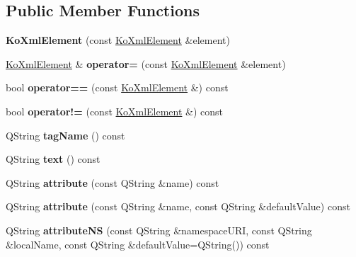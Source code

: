 \subsection*{Public Member Functions}
\begin{CompactItemize}
\item 
\hypertarget{classKoXmlElement_b5637448b6070d8ac7a84ab56890ca10}{
\textbf{KoXmlElement} (const \hyperlink{classKoXmlElement}{KoXmlElement} \&element)}
\label{classKoXmlElement_b5637448b6070d8ac7a84ab56890ca10}

\item 
\hypertarget{classKoXmlElement_eadd8e4eb16e9e3e3b9d2920fd183a34}{
\hyperlink{classKoXmlElement}{KoXmlElement} \& \textbf{operator=} (const \hyperlink{classKoXmlElement}{KoXmlElement} \&element)}
\label{classKoXmlElement_eadd8e4eb16e9e3e3b9d2920fd183a34}

\item 
\hypertarget{classKoXmlElement_83343b34a11ddcbe2bb896a37ea41b1a}{
bool \textbf{operator==} (const \hyperlink{classKoXmlElement}{KoXmlElement} \&) const }
\label{classKoXmlElement_83343b34a11ddcbe2bb896a37ea41b1a}

\item 
\hypertarget{classKoXmlElement_85276f0c883f6af251d52548dcb2e01f}{
bool \textbf{operator!=} (const \hyperlink{classKoXmlElement}{KoXmlElement} \&) const }
\label{classKoXmlElement_85276f0c883f6af251d52548dcb2e01f}

\item 
\hypertarget{classKoXmlElement_5a89263ce785d65bce2bd068fc2bcb54}{
QString \textbf{tagName} () const }
\label{classKoXmlElement_5a89263ce785d65bce2bd068fc2bcb54}

\item 
\hypertarget{classKoXmlElement_88971f674463f29dc7c5ac8923b75cd7}{
QString \textbf{text} () const }
\label{classKoXmlElement_88971f674463f29dc7c5ac8923b75cd7}

\item 
\hypertarget{classKoXmlElement_155d0ddfa0e45922fb485dc686da1b66}{
QString \textbf{attribute} (const QString \&name) const }
\label{classKoXmlElement_155d0ddfa0e45922fb485dc686da1b66}

\item 
\hypertarget{classKoXmlElement_0bd29a6227d6e8d9863734f5a3ed7fbd}{
QString \textbf{attribute} (const QString \&name, const QString \&defaultValue) const }
\label{classKoXmlElement_0bd29a6227d6e8d9863734f5a3ed7fbd}

\item 
\hypertarget{classKoXmlElement_da688c66b5cd1cecf0711de63fe8f347}{
QString \textbf{attributeNS} (const QString \&namespaceURI, const QString \&localName, const QString \&defaultValue=QString()) const }
\label{classKoXmlElement_da688c66b5cd1cecf0711de63fe8f347}


\end{CompactItemize}
